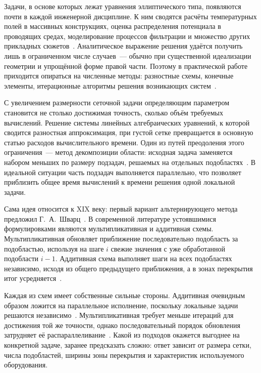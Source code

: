 
Задачи, в основе которых лежат уравнения эллиптического типа, появляются почти
в каждой инженерной дисциплине. К ним сводятся расчёты температурных полей в
массивных конструкциях, оценка распределения потенциала в проводящих средах,
моделирование процессов фильтрации и множество других прикладных
сюжетов~\cite{tihonov1999}. Аналитическое выражение решения удаётся получить
лишь в ограниченном числе случаев~--- обычно при существенной идеализации
геометрии и упрощённой форме правой части. Поэтому в практической работе
приходится опираться на численные методы: разностные схемы, конечные элементы,
итерационные алгоритмы решения возникающих систем~\cite{samarskii2001}.

С увеличением размерности сеточной задачи определяющим параметром становится не
столько достижимая точность, сколько объём требуемых вычислений. Решение
системы линейных алгебраических уравнений, к которой сводится разностная
аппроксимация, при густой сетке превращается в основную статью расходов
вычислительного времени. Один из путей преодоления этого ограничения~--- метод
декомпозиции области: исходная задача заменяется набором меньших по размеру
подзадач, решаемых на отдельных подобластях~\cite{toselli2005}. В идеальной
ситуации часть подзадач выполняется параллельно, что позволяет приблизить общее
время вычислений к времени решения одной локальной задачи.

Сама идея относится к XIX веку: первый вариант альтернирующего метода
предложил Г.~А.~Шварц~\cite{schwarz1870}. В современной литературе устоявшимися
формулировками являются мультипликативная и аддитивная схемы. Мультипликативная
обновляет приближение последовательно подобласть за подобластью, используя на
шаге $i$ свежие значения с уже обработанной подобласти $i-1$. Аддитивная схема
выполняет шаги на всех подобластях независимо, исходя из общего предыдущего
приближения, а в зонах перекрытия итог усредняется~\cite{quarteroni1999}.

Каждая из схем имеет собственные сильные стороны. Аддитивная очевидным образом
ложится на параллельное исполнение, поскольку локальные задачи решаются
независимо~\cite{cai1999}. Мультипликативная требует меньше итераций для
достижения той же точности, однако последовательный порядок обновления
затрудняет её распараллеливание~\cite{ortega1991}. Какой из подходов окажется
выгоднее на конкретной задаче, заранее предсказать сложно: ответ зависит от
размера сетки, числа подобластей, ширины зоны перекрытия и характеристик
используемого оборудования.

